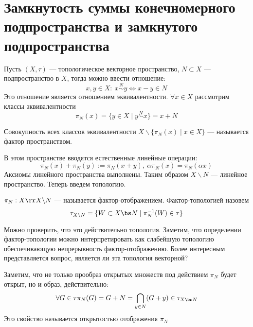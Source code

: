 \newpage
\section{Замкнутость суммы конечномерного подпространства и замкнутого подпространства}
Пусть $(X, \tau)$ --- топологическое векторное пространство, $N \subset X$ --- подпространство в $X$, тогда можно ввести отношение: 
$$
x, y \in X: \ x \stackrel{N}{\sim} y \Leftrightarrow x - y \in N
$$
Это отношение является отношением эквивалентности. 
$\forall x \in X$ рассмотрим классы эквивалентности
$$
\pi_N(x) = \{ y \in X \mid y \stackrel{N}{\sim} x\} = x + N
$$
\begin{definition}
	Совокупность всех классов эквивалентности $X \backslash \{\pi_N(x) \mid x \in X\}$ --- называется фактор пространством.
\end{definition}
В этом пространстве вводятся естественные линейные операции:
$$
\pi_N(x) + \pi_N(y) := \pi_N(x+y), \ \alpha \pi_N(x) = \pi_N(\alpha x)
$$
Аксиомы линейного пространства выполнены. Таким образом $X \backslash N$ --- линейное пространство. Теперь введем топологию.
\begin{definition}
	$\pi_N: X \rr X \backslash N$ --- называется фактор-отображением. Фактор-топологией назовем
	$$
	\tau_{X \backslash N} = \{ W \subset X \bs N \mid \pi_N^{-1}(W) \in \tau\}
	$$
\end{definition}
Можно проверить, что это действительно топология. Заметим, что определении фактор-топологии можно интерпретировать как слабейшую топологию обеспечивающую непрерывность фактор-отображению. Более интересным представляется вопрос, является ли эта топология векторной?
 
Заметим, что не только прообраз открытых множеств под действием $\pi_N$ будет открыт, но и образ, действительно:
$$
\forall G \in \tau \pi_N(G) = G + N = \bigcap_{y \in N }(G + y) \in \tau_{X\bs N}
$$
Это свойство называется открытостью отображения $\pi_N$


